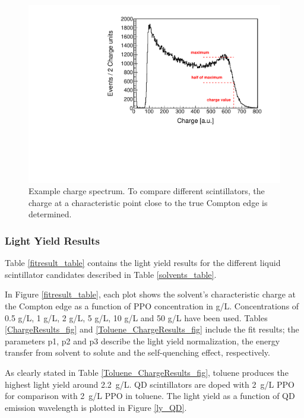 \documentclass{JINST}
\begin{document}
\begin{figure}[tbh]
        \begin{center}
        \includegraphics[scale=0.6]{graphs/toluene_5gL_PPO_Floats_final.pdf}
\caption[]{Example charge spectrum. To compare different scintillators, the charge at a characteristic point close to the true Compton edge is determined. \label{ChargeSpec_fig}}
 \end{center}
\end{figure}

\subsubsection{Light Yield Results}\label{ly_results}
Table \ref{fitresult_table} contains the light yield results for the different liquid scintillator candidates described in Table \ref{solvents_table}.

In Figure \ref{fitresult_table}, each plot shows the solvent's characteristic charge at the Compton edge as a function
of PPO concentration in g/L. Concentrations of 0.5 g/L, 1 g/L, 2 g/L, 5 g/L, 10 g/L and 50 g/L have
been used. Tables \ref{ChargeResults_fig} and \ref{Toluene_ChargeResults_fig} include the fit results; the parameters p1, p2 and p3 describe the light yield normalization,
the energy transfer from solvent to solute and the self-quenching effect, respectively.

As clearly stated in Table \ref{Toluene_ChargeResults_fig}, toluene produces the highest light yield around 2.2~g/L.  QD scintillators are doped with 2~g/L PPO for comparison with 2~g/L PPO in toluene. The light yield as a function of QD emission wavelength is plotted in Figure \ref{ly_QD}.
\end{document}
